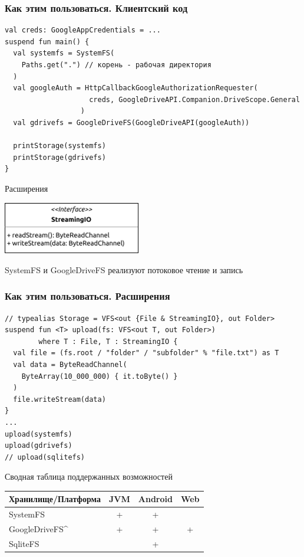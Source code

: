 \documentclass[14pt,aspectratio=169,hyperref={pdftex,unicode},xcolor=dvipsnames]{beamer}
\begin{document}
\begin{frame}[fragile]
\frametitle{Как этим пользоваться. Клиентский код}
\begin{verbatim}
val creds: GoogleAppCredentials = ...
suspend fun main() {
  val systemfs = SystemFS(
    Paths.get(".") // корень - рабочая директория
  )
  val googleAuth = HttpCallbackGoogleAuthorizationRequester(
                    creds, GoogleDriveAPI.Companion.DriveScope.General
                  )
  val gdrivefs = GoogleDriveFS(GoogleDriveAPI(googleAuth))

  printStorage(systemfs)
  printStorage(gdrivefs)
}
\end{verbatim}
\end{frame}

\begin{frame}{Расширения}
  \begin{center}
    \includegraphics[width=6cm,keepaspectratio]{streamingio}
  \end{center}
  \small SystemFS и GoogleDriveFS реализуют потоковое чтение и запись
\end{frame}

\begin{frame}[fragile]
\frametitle{Как этим пользоваться. Расширения}
\begin{verbatim}
// typealias Storage = VFS<out {File & StreamingIO}, out Folder>
suspend fun <T> upload(fs: VFS<out T, out Folder>)
        where T : File, T : StreamingIO {
  val file = (fs.root / "folder" / "subfolder" % "file.txt") as T
  val data = ByteReadChannel(
    ByteArray(10_000_000) { it.toByte() }
  )
  file.writeStream(data)
}
...
upload(systemfs)
upload(gdrivefs)
// upload(sqlitefs)
\end{verbatim}
\end{frame}
  

\begin{frame}{Сводная таблица поддержанных возможностей}
\centering
\begin{tabular}{lccc}
  Хранилище/Платформа & JVM & Android & Web \\
\hline\hline
  SystemFS\footnotemark{} & + & + &  \\
  GoogleDriveFS^\footnotemark[\value{footnote}] & + & + & + \\
  SqliteFS &  & + & \\
\end{tabular}
\end{frame}
\end{document}
